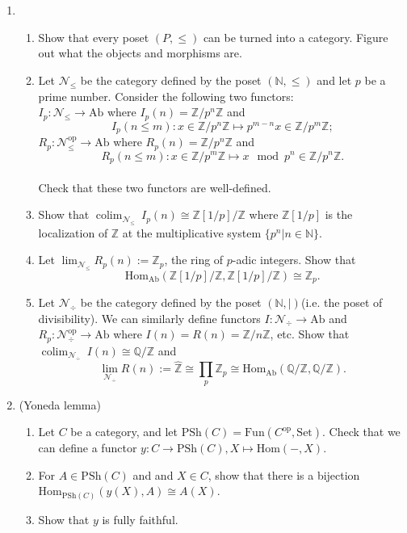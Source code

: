 \documentclass[a4paper,11pt]{article}
\def\bb#1{\mathbb{#1}}
\def\bZ{\mathbb{Z}}
\def\Zmd#1{\bZ/#1\bZ}
\def\mrm#1{\mathrm{#1}}
\def\Hom{\mathrm{Hom}}
\def\Ab{\mathrm{Ab}}
\def\PSh{\mathrm{PSh}}
\DeclareMathOperator{\colim}{colim}
\begin{document}
\begin{enumerate}[1.]
\item
\begin{enumerate}
    \item Show that every poset $(P,\leq)$ can be turned into a category. Figure out what the objects and morphisms are.
    \item Let $ \mathcal{N}_{\leq} $ be the category defined by the poset $ (\bb{N},\leq)$ and let $p$ be a prime number. Consider the following two functors: \\$I_p: \mathcal{N}_{\leq} \to \mrm{Ab} $ where $I_p(n)=\Zmd{p^n}$ and 
    \[
    I_p(n\leq m): x\in \Zmd{p^n} \mapsto p^{m-n}x\in \Zmd{p^m} ;
    \]
    $R_p: \mathcal{N}_{\leq}^{\mrm{op}} \to \mrm{Ab} $ where $R_p(n)=\Zmd{p^n}$ and 
    \[
    R_p(n\leq m): x \in \Zmd{p^m} \mapsto x \mod p^n \in \Zmd{p^n}.
    \]
    \\ Check that these two functors are well-defined.
    \item Show that $\colim_{\mathcal{N}_{\leq}}\  I_p(n) \cong \bZ[1/p]/\bZ $ where $\bZ[1/p]$ is the localization of $\bZ$ at the multiplicative system $\{p^n\vert n\in \mathbb{N}\}$.
    \item Let $\lim_{\mathcal{N}_{\leq}}  R_p(n) := \bZ_p$, the ring of $p$-adic integers. Show that 
    \[
    \Hom_{\Ab}(\bZ[1/p]/\bZ ,\bZ[1/p]/\bZ )\cong \bZ_p.
    \] 
    \item Let $ \mathcal{N}_{\div} $ be the category defined by the poset $ (\bb{N},\mid )$(i.e. the poset of divisibility). We can similarly define functors $I :\mathcal{N}_{\div} \to \mrm{Ab}$ and $R_p: \mathcal{N}_{\div}^{\mrm{op}} \to \mrm{Ab} $ where $I(n)=R(n)=\Zmd{n}$, etc. Show that $\colim_{\mathcal{N}_{\div}}\ I(n) \cong \bb{Q}/\bZ$ and 
    \[
    \lim_{\mathcal{N}_{\div}} R(n) := \hat{\bZ} \cong \prod _p \bZ_p \cong \Hom_{\Ab}(\bb{Q}/\bZ,\bb{Q}/\bZ).
    \] 
\end{enumerate}
\item (Yoneda lemma) 
\begin{enumerate}
    \item Let $C$ be a category, and let $  \PSh(C)=\mrm{Fun}(C^{\mrm{op}},\mrm{Set}) $. Check that we can define a functor $y: C\to \PSh(C), X \mapsto \Hom(-,X)$.
    \item For $A\in \PSh(C)$ and and $X \in C$, show that there
    is a bijection $\Hom_{\PSh(C)}(y(X),A)\cong A(X)$.
    \item Show that $y$ is fully faithful.
\end{enumerate}


\end{enumerate}
\end{document}
